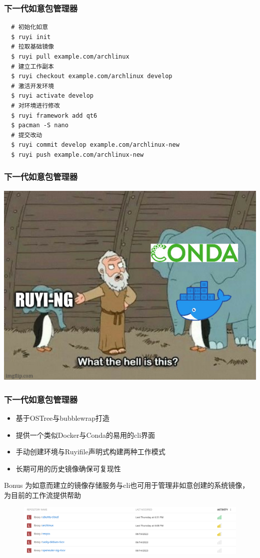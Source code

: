 \documentclass{ctexbeamer}
\begin{document}
\begin{frame}[fragile]
  \frametitle{下一代如意包管理器}
  \begin{verbatim}
  # 初始化如意
  $ ruyi init
  # 拉取基础镜像
  $ ruyi pull example.com/archlinux
  # 建立工作副本
  $ ruyi checkout example.com/archlinux develop
  # 激活开发环境
  $ ruyi activate develop
  # 对环境进行修改
  $ ruyi framework add qt6
  $ pacman -S nano
  # 提交改动
  $ ruyi commit develop example.com/archlinux-new
  $ ruyi push example.com/archlinux-new
  \end{verbatim}
\end{frame}

\begin{frame}
  \frametitle{下一代如意包管理器}
  \includegraphics[width=\linewidth]{./ruyi-meme.jpg}
\end{frame}

\begin{frame}
  \frametitle{下一代如意包管理器}
  \begin{itemize}
    \item 基于OSTree与bubblewrap打造
    \item 提供一个类似Docker与Conda的易用的cli界面
    \item 手动创建环境与Ruyifile声明式构建两种工作模式
    \item 长期可用的历史镜像确保可复现性
  \end{itemize}
  \begin{exampleblock}{Bonus}
    为如意而建立的镜像存储服务与cli也可用于管理非如意创建的系统镜像，为目前的工作流提供帮助
  \end{exampleblock}
  \begin{figure}
    \includegraphics[width=\linewidth]{./images.png}
  \end{figure}
\end{frame}
\end{document}
